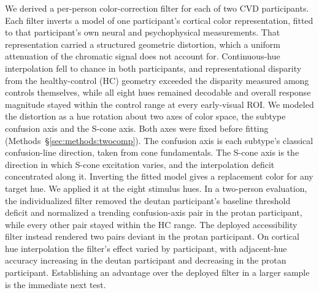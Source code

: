 We derived a per-person color-correction filter for each of two CVD participants. Each filter inverts a model of one participant's cortical color representation, fitted to that participant's own neural and psychophysical measurements. That representation carried a structured geometric distortion, which a uniform attenuation of the chromatic signal does not account for. Continuous-hue interpolation fell to chance in both participants, and representational disparity from the healthy-control (HC) geometry exceeded the disparity measured among controls themselves, while all eight hues remained decodable and overall response magnitude stayed within the control range at every early-visual ROI. We modeled the distortion as a hue rotation about two axes of color space, the subtype confusion axis and the S-cone axis. Both axes were fixed before fitting (Methods~\S\ref{sec:methods:twocomp}). The confusion axis is each subtype's classical confusion-line direction, taken from cone fundamentals. The S-cone axis is the direction in which S-cone excitation varies, and the interpolation deficit concentrated along it. Inverting the fitted model gives a replacement color for any target hue. We applied it at the eight stimulus hues. In a two-person evaluation, the individualized filter removed the deutan participant's baseline threshold deficit and normalized a trending confusion-axis pair in the protan participant, while every other pair stayed within the HC range. The deployed accessibility filter instead rendered two pairs deviant in the protan participant. On cortical hue interpolation the filter's effect varied by participant, with adjacent-hue accuracy increasing in the deutan participant and decreasing in the protan participant. Establishing an advantage over the deployed filter in a larger sample is the immediate next test.

